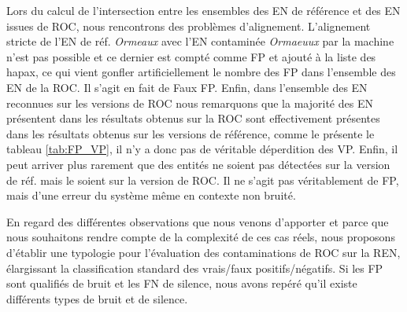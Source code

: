 Lors du calcul de l'intersection entre les ensembles des EN de référence et des EN issues de ROC, nous rencontrons des problèmes d'alignement. L'alignement stricte de l'EN de réf. \textit{Ormeaux} avec l'EN contaminée \textit{Ormaeuux} par la machine n'est pas possible et ce dernier est compté comme FP et ajouté à la liste des hapax, ce qui vient gonfler artificiellement le nombre des FP dans l'ensemble des EN de la ROC. Il s'agit en fait de Faux FP. Enfin, dans l'ensemble des EN reconnues sur les versions de ROC nous remarquons que la majorité des EN présentent dans les résultats obtenus sur la ROC sont effectivement présentes dans les résultats obtenus sur les versions de référence, comme le présente le tableau \ref{tab:FP_VP}, il n'y a donc pas de véritable déperdition des VP. Enfin, il peut arriver plus rarement que des entités ne soient pas détectées sur la version de réf. mais le soient sur la version de ROC. Il ne s'agit pas véritablement de FP, mais d'une erreur du système même en contexte non bruité.



En regard des différentes observations que nous venons d'apporter et parce que nous souhaitons rendre compte de la complexité de ces cas réels, nous proposons d'établir une typologie pour l'évaluation des contaminations de ROC sur la REN, élargissant la classification standard des vrais/faux positifs/négatifs. Si les FP sont qualifiés de bruit et les FN de silence, nous avons repéré qu'il existe différents types de bruit et de silence. %



